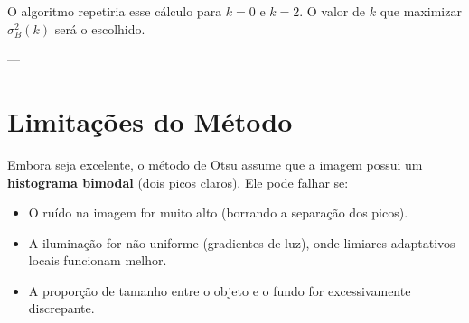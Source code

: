 \documentclass[12pt, a4paper]{article}
\begin{document}
O algoritmo repetiria esse cálculo para $k=0$ e $k=2$. O valor de $k$ que maximizar $\sigma_B^2(k)$ será o escolhido.

---

\section{Limitações do Método}

Embora seja excelente, o método de Otsu assume que a imagem possui um \textbf{histograma bimodal} (dois picos claros). Ele pode falhar se:
\begin{itemize}
    \item O ruído na imagem for muito alto (borrando a separação dos picos).
    \item A iluminação for não-uniforme (gradientes de luz), onde limiares adaptativos locais funcionam melhor.
    \item A proporção de tamanho entre o objeto e o fundo for excessivamente discrepante.
\end{itemize}
\end{document}
